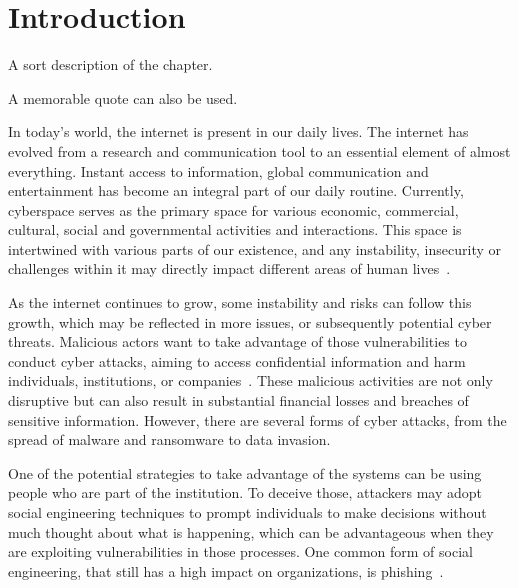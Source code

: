 \chapter{Introduction}
\label{chapter:introduction}

\begin{introduction}
A sort description of the chapter.

A memorable quote can also be used.
\end{introduction}





In today's world, the internet is present in our daily lives. The internet has evolved from a research and communication tool to an essential element of almost everything. Instant access to information, global communication and entertainment has become an integral part of our daily routine. Currently, cyberspace serves as the primary space for various economic, commercial, cultural, social and governmental activities and interactions. This space is intertwined with various parts of our existence, and any instability, insecurity or challenges within it may directly impact different areas of human lives~\cite{li2021comprehensive}. 

As the internet continues to grow, some instability and risks can follow this growth, which may be reflected in more issues, or subsequently potential cyber threats. Malicious actors want to take advantage of those vulnerabilities to conduct cyber attacks, aiming to access confidential information and harm individuals, institutions, or companies~\cite{bendovschi2015cyber}. These malicious activities are not only disruptive but can also result in substantial financial losses and breaches of sensitive information. However, there are several forms of cyber attacks, from the spread of malware and ransomware to data invasion.

One of the potential strategies to take advantage of the systems can be using people who are part of the institution. To deceive those, attackers may adopt social engineering techniques to prompt individuals to make decisions without much thought about what is happening, which can be advantageous when they are exploiting vulnerabilities in those processes. One common form of social engineering, that still has a high impact on organizations, is phishing~\cite{cisa2023cyberattacks}.

